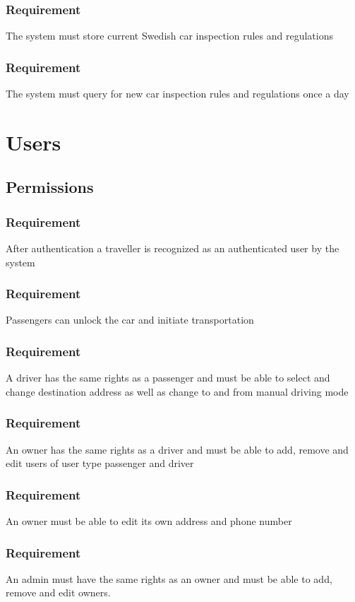 \documentclass{article}
\begin{document}
{    \subsubsection{Requirement}
\hfill \break 
\- \- \-The system must store current Swedish car inspection rules and regulations
    \subsubsection{Requirement}
\hfill \break 
\- \- \-The system must query for new car inspection rules and regulations once a day


\section{Users}
  \subsection{Permissions}
      \subsubsection{Requirement}
\hfill \break 
\- \- \-After authentication a traveller is recognized as an authenticated user by the system
      \subsubsection{Requirement}
\hfill \break 
\- \- \-Passengers can unlock the car and initiate transportation
      \subsubsection{Requirement}
\hfill \break 
\- \- \-A driver has the same rights as a passenger and must be able to select and change destination address as well as change to and from manual driving mode
      \subsubsection{Requirement}
\hfill \break 
\- \- \-An owner has the same rights as a driver and must be able to add, remove and edit users of user type passenger and driver
      \subsubsection{Requirement}
\hfill \break 
\- \- \-An owner must be able to edit its own address and phone number
      \subsubsection{Requirement}
\hfill \break 
\- \- \-An admin must have the same rights as an owner and must be able to add, remove and edit owners.
}
\end{document}
